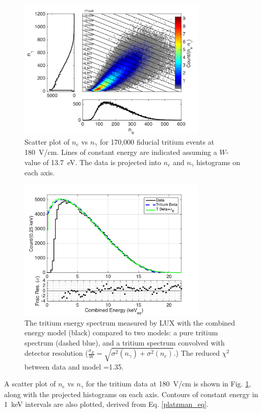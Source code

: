 \begin{figure}[h!]
\includegraphics[width=90mm]{fig/tritium_scatter.png}
\caption{Scatter plot of $n_e$ vs $n_{\gamma}$ for 170,000 fiducial tritium events at 180~V/cm. Lines of constant energy are indicated assuming a $W$-value of 13.7~eV. The data is projected into $n_e$ and $n_{\gamma}$ histograms on each axis.}
\label{fig:tritium-scatter}
\end{figure}


\begin{figure}[h!]
\begin{center}
\includegraphics[width=90mm]{fig/tritium-spectrum-linear.png}
\caption{The tritium energy spectrum measured by LUX with the combined energy model (black) compared to two models: a pure tritium spectrum (dashed blue), and a tritium spectrum convolved with detector resolution  ($\frac{\sigma_E}{W} = \sqrt{\sigma^2(n_{\gamma})+ \sigma^2(n_e)}$.) The reduced $\chi^2$ between data and model =1.35.}
\label{fig:tritium-spectrum}
\end{center}
\end{figure}


A scatter plot of $n_e$ vs $n_{\gamma}$ for the tritium data at 180~V/cm is shown in Fig. \ref{fig:tritium-scatter}, along with the projected histograms on each axis. Contours of constant energy in 1~keV intervals are also plotted, derived from Eq. \ref{platzman_eq}. 

